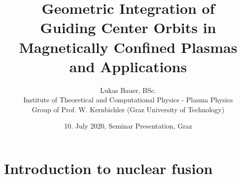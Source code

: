 \documentclass{beamer}
\title[]
{Geometric Integration of \\Guiding Center Orbits in Magnetically Confined Plasmas and Applications}
\author[L.~Bauer]{\scriptsize Lukas Bauer, BSc. \\
	Institute of Theoretical and Computational Physics - Plasma Physics\\Group of Prof. W. Kernbichler (Graz University of Technology)
}
\date{10. July 2020, Seminar Presentation, Graz} %
\institute[Institute of Theoretical and Computational Physics]
{
}
\begin{document}
\titleframe






\section{Introduction to nuclear fusion}
\end{document}
